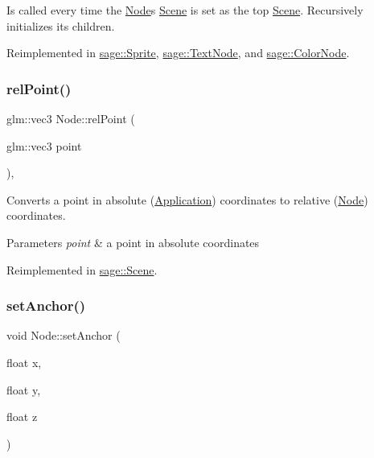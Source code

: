Is called every time the \mbox{\hyperlink{classsage_1_1Node}{Node}}\textquotesingle{}s \mbox{\hyperlink{classsage_1_1Scene}{Scene}} is set as the top \mbox{\hyperlink{classsage_1_1Scene}{Scene}}. Recursively initializes its children. 



Reimplemented in \mbox{\hyperlink{classsage_1_1Sprite_aeaf5c7aa5aeff1b0a4da9e66430f1c42}{sage\+::\+Sprite}}, \mbox{\hyperlink{classsage_1_1TextNode_ae389b7b4afae4d068ac29686343f279e}{sage\+::\+Text\+Node}}, and \mbox{\hyperlink{classsage_1_1ColorNode_a1a5a055be2cc8d15b38c5c25eb489e94}{sage\+::\+Color\+Node}}.

\mbox{\label{classsage_1_1Node_a40edd1724c0956ef7794225fba8353c0}} 
\subsubsection{\texorpdfstring{relPoint()}{relPoint()}}
{\footnotesize\ttfamily glm\+::vec3 Node\+::rel\+Point (\begin{DoxyParamCaption}\item[{glm\+::vec3}]{point }\end{DoxyParamCaption})\hspace{0.3cm}{\ttfamily [protected]}, {\ttfamily [virtual]}}



Converts a point in absolute (\mbox{\hyperlink{classsage_1_1Application}{Application}}) coordinates to relative (\mbox{\hyperlink{classsage_1_1Node}{Node}}) coordinates. 


\begin{DoxyParams}{Parameters}
{\em point} & a point in absolute coordinates \\
\hline
\end{DoxyParams}


Reimplemented in \mbox{\hyperlink{classsage_1_1Scene_ae68e14c0f453db078df4b515fdea83f7}{sage\+::\+Scene}}.

\mbox{\label{classsage_1_1Node_a04d15cec594320725e6ef44756346d2a}} 
\subsubsection{\texorpdfstring{setAnchor()}{setAnchor()}\hspace{0.1cm}{\footnotesize\ttfamily [1/4]}}
{\footnotesize\ttfamily void Node\+::set\+Anchor (\begin{DoxyParamCaption}\item[{float}]{x,  }\item[{float}]{y,  }\item[{float}]{z }\end{DoxyParamCaption})}



